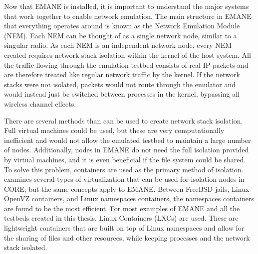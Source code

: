 Now that EMANE is installed, it is important to understand the major systems that work together to enable network emulation.
The main structure in EMANE that everything operates around is known as the Network Emulation Module (NEM).
Each NEM can be thought of as a single network node, similar to a singular radio.
As each NEM is an independent network node, every NEM created requires network stack isolation within the kernel of the host system.
All the traffic flowing through the emulation testbed consists of real IP packets and are therefore treated like regular network traffic by the kernel.
If the network stacks were not isolated, packets would not route through the emulator and would instead just be switched between processes in the kernel, bypassing all wireless channel effects.\par
There are several methods than can be used to create network stack isolation.
Full virtual machines could be used, but these are very computationally inefficient and would not allow the emulated testbed to maintain a large number of nodes.
Additionally, nodes in EMANE do not need the full isolation provided by virtual machines, and it is even beneficial if the file system could be shared.
To solve this problem, containers are used as the primary method of isolation.
\cite{core_containers} examines several types of virtualization that can be used for isolation nodes in CORE, but the same concepts apply to EMANE.
Between FreeBSD jails, Linux OpenVZ containers, and Linux namespaces containers, the namespaces containers are found to be the most efficient.
For most examples of EMANE and all the testbeds created in this thesis, Linux Containers (LXCs) are used.
These are lightweight containers that are built on top of Linux namespaces and allow for the sharing of files and other resources, while keeping processes and the network stack isolated.\par

